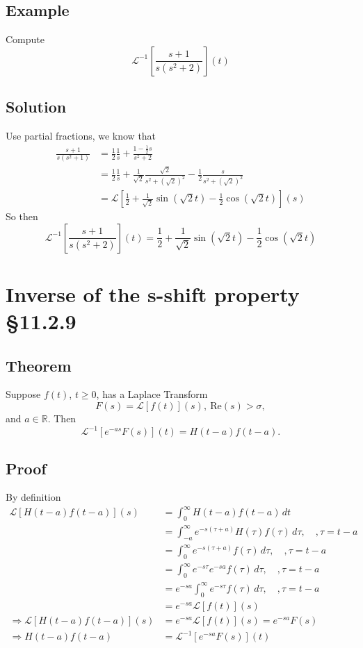\documentclass[11pt]{article}
\newcommand{\reals}{\mathbb{R}}
\newcommand{\Laplace}{\mathscr{L}}
\begin{document}
\subsection{Example}
Compute
\[ \Laplace^{-1}\left[ \frac{s+1}{s(s^2 + 2)} \right](t) \]

\subsection*{Solution}
Use partial fractions, we know that
\begin{align*}
\frac{s+1}{s(s^2 + 1)} &= \frac{1}{2}\frac{1}{s} + \frac{1 - \frac{1}{2}s}{s^2 + 2} \\
&= \frac{1}{2}\frac{1}{s} + \frac{1}{\sqrt{2}}\frac{\sqrt{2}}{s^2 + (\sqrt{2})^2} - \frac{1}{2}\frac{s}{s^2 + (\sqrt{2})^2} \\
&= \Laplace \left[ \frac{1}{2} + \frac{1}{\sqrt{2}}\sin(\sqrt{2}t) - \frac{1}{2}\cos(\sqrt{2}t) \right](s)
\end{align*}
So then
\[ \Laplace^{-1}\left[ \frac{s+1}{s(s^2 + 2)} \right](t) = \frac{1}{2} + \frac{1}{\sqrt{2}}\sin(\sqrt{2}t) - \frac{1}{2}\cos(\sqrt{2}t) \]

\section{Inverse of the s-shift property §11.2.9}
\subsection{Theorem}
Suppose $f(t)$, $t \geq 0$, has a Laplace Transform
\[ F(s) = \Laplace[f(t)](s),\ \text{Re}(s) > \sigma, \]
and $a \in \reals$. Then
\[ \Laplace^{-1}[e^{-as}F(s)](t) = H(t-a)f(t-a). \]

\subsection{Proof}
By definition
\begin{align*}
\Laplace[H(t-a)f(t-a)](s) &= \int_0^\infty H(t-a)f(t-a)\, dt \\
&= \int_{-a}^\infty e^{-s(\tau + a)}H(\tau)f(\tau)\, d\tau,\quad , \tau = t-a \\
&= \int_0^\infty e^{-s(\tau + a)}f(\tau)\, d\tau,\quad , \tau = t-a \\
&= \int_0^\infty e^{-s\tau}e^{-sa}f(\tau)\, d\tau,\quad , \tau = t-a \\
&= e^{-sa} \int_0^\infty e^{-s\tau}f(\tau)\, d\tau,\quad , \tau = t-a \\
&= e^{-sa} \Laplace[f(t)](s) \\
\Rightarrow \Laplace[H(t-a)f(t-a)](s) &= e^{-sa} \Laplace[f(t)](s) = e^{-sa}F(s) \\
\Rightarrow H(t-a)f(t-a) &= \Laplace^{-1}[e^{-sa}F(s)](t)
\end{align*}
\end{document}
